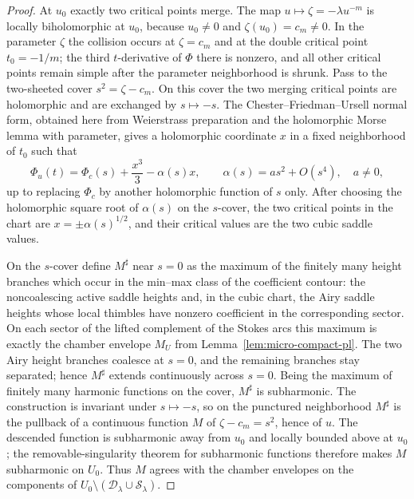 \documentclass[reqno]{article}
\theoremstyle{definition}
\theoremstyle{remark}
\theoremstyle{plain}
\begin{document}
\begin{proof}
At $u_0$ exactly two critical points merge. The map $u\mapsto\zeta=-\lambda u^{-m}$ is locally biholomorphic at $u_0$, because $u_0\ne0$ and $\zeta(u_0)=c_m\ne0$. In the parameter $\zeta$ the collision occurs at $\zeta=c_m$ and at the double critical point $t_0=-1/m$; the third $t$-derivative of $\Phi$ there is nonzero, and all other critical points remain simple after the parameter neighborhood is shrunk. Pass to the two-sheeted cover $s^2=\zeta-c_m$. On this cover the two merging critical points are holomorphic and are exchanged by $s\mapsto -s$. The Chester--Friedman--Ursell normal form, obtained here from Weierstrass preparation and the holomorphic Morse lemma with parameter, gives a holomorphic coordinate $x$ in a fixed neighborhood of $t_0$ such that
\[
\Phi_u(t)=\Phi_c(s)+\frac{x^3}{3}-\alpha(s)x,
\qquad
\alpha(s)=a s^2+O(s^4),\quad a\ne0,
\]
up to replacing $\Phi_c$ by another holomorphic function of $s$ only. After choosing the holomorphic square root of $\alpha(s)$ on the $s$-cover, the two critical points in the chart are $x=\pm\alpha(s)^{1/2}$, and their critical values are the two cubic saddle values.

On the $s$-cover define $M^\sharp$ near $s=0$ as the maximum of the finitely many height branches which occur in the min--max class of the coefficient contour: the noncoalescing active saddle heights and, in the cubic chart, the Airy saddle heights whose local thimbles have nonzero coefficient in the corresponding sector. On each sector of the lifted complement of the Stokes arcs this maximum is exactly the chamber envelope $M_U$ from Lemma~\ref{lem:micro-compact-pl}. The two Airy height branches coalesce at $s=0$, and the remaining branches stay separated; hence $M^\sharp$ extends continuously across $s=0$. Being the maximum of finitely many harmonic functions on the cover, $M^\sharp$ is subharmonic. The construction is invariant under $s\mapsto -s$, so on the punctured neighborhood $M^\sharp$ is the pullback of a continuous function $M$ of $\zeta-c_m=s^2$, hence of $u$. The descended function is subharmonic away from $u_0$ and locally bounded above at $u_0$; the removable-singularity theorem for subharmonic functions therefore makes $M$ subharmonic on $U_0$. Thus $M$ agrees with the chamber envelopes on the components of $U_0\setminus(\mathcal D_\lambda\cup\mathcal S_\lambda)$.


\end{proof}
\end{document}
